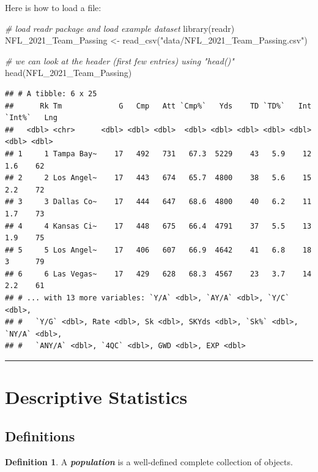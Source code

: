 \documentclass[
]{book}
\newenvironment{Shaded}{\begin{snugshade}}{\end{snugshade}}
\newcommand{\CommentTok}[1]{\textcolor[rgb]{0.56,0.35,0.01}{\textit{#1}}}
\newcommand{\FunctionTok}[1]{\textcolor[rgb]{0.00,0.00,0.00}{#1}}
\newcommand{\NormalTok}[1]{#1}
\newcommand{\OtherTok}[1]{\textcolor[rgb]{0.56,0.35,0.01}{#1}}
\newcommand{\StringTok}[1]{\textcolor[rgb]{0.31,0.60,0.02}{#1}}
\theoremstyle{definition}
\newtheorem{definition}{Definition}[chapter]
\theoremstyle{definition}
\theoremstyle{definition}
\theoremstyle{definition}
\theoremstyle{remark}
\begin{document}
Here is how to load a file:

\begin{Shaded}
\begin{Highlighting}[]
\CommentTok{\# load readr package and load example dataset}
\FunctionTok{library}\NormalTok{(readr)}
\NormalTok{NFL\_2021\_Team\_Passing }\OtherTok{\textless{}{-}} \FunctionTok{read\_csv}\NormalTok{(}\StringTok{"data/NFL\_2021\_Team\_Passing.csv"}\NormalTok{)}

\CommentTok{\# we can look at the header (first few entries) using "head()"}
\FunctionTok{head}\NormalTok{(NFL\_2021\_Team\_Passing)}
\end{Highlighting}
\end{Shaded}

\begin{verbatim}
## # A tibble: 6 x 25
##      Rk Tm             G   Cmp   Att `Cmp%`   Yds    TD `TD%`   Int `Int%`   Lng
##   <dbl> <chr>      <dbl> <dbl> <dbl>  <dbl> <dbl> <dbl> <dbl> <dbl>  <dbl> <dbl>
## 1     1 Tampa Bay~    17   492   731   67.3  5229    43   5.9    12    1.6    62
## 2     2 Los Angel~    17   443   674   65.7  4800    38   5.6    15    2.2    72
## 3     3 Dallas Co~    17   444   647   68.6  4800    40   6.2    11    1.7    73
## 4     4 Kansas Ci~    17   448   675   66.4  4791    37   5.5    13    1.9    75
## 5     5 Los Angel~    17   406   607   66.9  4642    41   6.8    18    3      79
## 6     6 Las Vegas~    17   429   628   68.3  4567    23   3.7    14    2.2    61
## # ... with 13 more variables: `Y/A` <dbl>, `AY/A` <dbl>, `Y/C` <dbl>,
## #   `Y/G` <dbl>, Rate <dbl>, Sk <dbl>, SKYds <dbl>, `Sk%` <dbl>, `NY/A` <dbl>,
## #   `ANY/A` <dbl>, `4QC` <dbl>, GWD <dbl>, EXP <dbl>
\end{verbatim}

\begin{center}\rule{0.5\linewidth}{0.5pt}\end{center}

\hypertarget{descriptive-statistics}{%
\section{Descriptive Statistics}\label{descriptive-statistics}}

\hypertarget{definitions}{%
\subsection{Definitions}\label{definitions}}

\begin{definition}
A \textbf{\emph{population}} is a well-defined complete collection of objects.
\end{definition}
\end{document}
